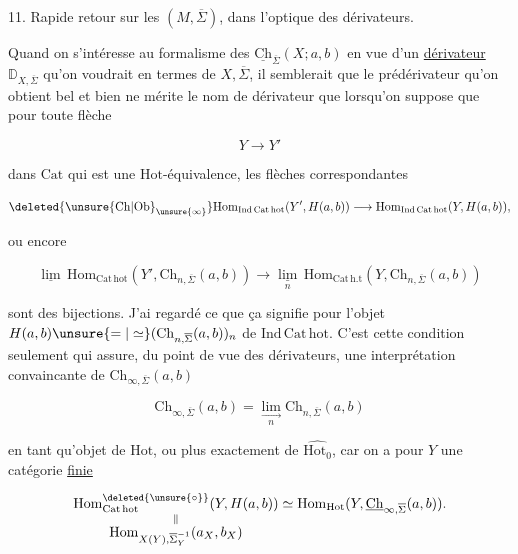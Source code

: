 
11. Rapide retour  sur les $(M,\overline\Sigma)$, dans l'optique des dérivateurs.

Quand on s'intéresse au formalisme des $\underline{\mathrm{Ch}}_{\overline\Sigma}(X;a,b)$ en vue d'un \uline{dérivateur} $\mathbb D_{X,\overline\Sigma}$ qu'on voudrait  en termes de $X,\overline\Sigma$, il semblerait que le  prédérivateur qu'on obtient bel et bien ne mérite le nom de dérivateur que lorsqu'on suppose que pour toute flèche

\[
Y\longrightarrow Y'
\]

dans $\mathrm{Cat}$ qui est une $\mathrm{Hot}$-équivalence, les flèches correspondantes

\[
\deleted{\unsure{\mathrm{Ch}|\mathrm{Ob}}_{\unsure{\infty}}}\mathrm{Hom}_{\mathrm{Ind\,Cat\,hot}}(Y',H(a,b))\longrightarrow\mathrm{Hom}_{\mathrm{Ind\,Cat\,hot}}(Y,H(a,b)),
\]

ou encore

\[
\underline{\lim}\,\mathrm{Hom}_{\mathrm{Cat\,hot}}(Y',\mathrm{Ch}_{n,\overline\Sigma}(a,b))\longrightarrow
\underset{n}{\underline{\lim}}\,\mathrm{Hom}_{\mathrm{Cat\,h.t}}(Y,\mathrm{Ch}_{n,\overline\Sigma}(a,b))
\]

sont des bijections. J'ai regardé  ce que ça signifie pour l'objet $H(a,b)\unsure{=|\simeq}(\mathrm{Ch}_{n,\overline\Sigma}(a,b))_n$ de $\mathrm{Ind\,Cat\,hot}$. C'est cette condition seulement qui assure, du point de vue des dérivateurs, une interprétation convaincante de $\mathrm{Ch}_{\infty,\overline\Sigma}(a,b)$

\[
\mathrm{Ch}_{\infty,\overline\Sigma}(a,b)=\underset{n}{\underset{\longrightarrow}{\lim}}\mathrm{Ch}_{n,\overline\Sigma}(a,b)
\]

en tant qu'objet de $\mathrm{Hot}$, ou plus exactement de $\widehat{\mathrm{Hot}_0}$, car on a  pour $Y$ une catégorie \uline{finie}

\[
\underset{\substack{\Vert\\ \displaystyle\mathrm{Hom}_{X(Y),\overline\Sigma_Y^{-1}}(a_X,b_X)}}{\mathrm{Hom}^{\deleted{\unsure{\circ}}}_{\mathrm{Cat\,hot}}(Y,H(a,b))}
\simeq\mathrm{Hom}_{\mathrm{Hot}}(Y,\underline{\mathrm{Ch}}_{\infty,\overline\Sigma}(a,b)).
\]

